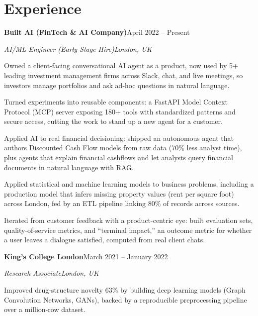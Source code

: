\documentclass[10pt,a4paper]{article}
\newcommand{\entry}[4]{%
  {\color{company}\bfseries #1}\hfill {\color{muted}#2}\par
  \vspace{1pt}
  {\itshape #3}\hfill {\color{muted}\itshape #4}\par
  \vspace{3pt}%
}
\begin{document}
\section{Experience}
\entry{Built AI (FinTech \& AI Company)}{April 2022 -- Present}{AI/ML Engineer (Early Stage Hire)}{London, UK}
\begin{tight}
  \item Owned a client-facing conversational AI agent as a product, now used by 5+ leading investment management firms across Slack, chat, and live meetings, so investors manage portfolios and ask ad-hoc questions in natural language.
  \item Turned experiments into reusable components: a FastAPI Model Context Protocol (MCP) server exposing 180+ tools with standardized patterns and secure access, cutting the work to stand up a new agent for a customer.
  \item Applied AI to real financial decisioning: shipped an autonomous agent that authors Discounted Cash Flow models from raw data (70\% less analyst time), plus agents that explain financial cashflows and let analysts query financial documents in natural language with RAG.
  \item Applied statistical and machine learning models to business problems, including a production model that infers missing property values (rent per square foot) across London, fed by an ETL pipeline linking 80\% of records across sources.
  \item Iterated from customer feedback with a product-centric eye: built evaluation sets, quality-of-service metrics, and ``terminal impact,'' an outcome metric for whether a user leaves a dialogue satisfied, computed from real client chats.
\end{tight}

\entry{King's College London}{March 2021 -- January 2022}{Research Associate}{London, UK}
\begin{tight}
  \item Improved drug-structure novelty 63\% by building deep learning models (Graph Convolution Networks, GANs), backed by a reproducible preprocessing pipeline over a million-row dataset.
\end{tight}

\end{document}
